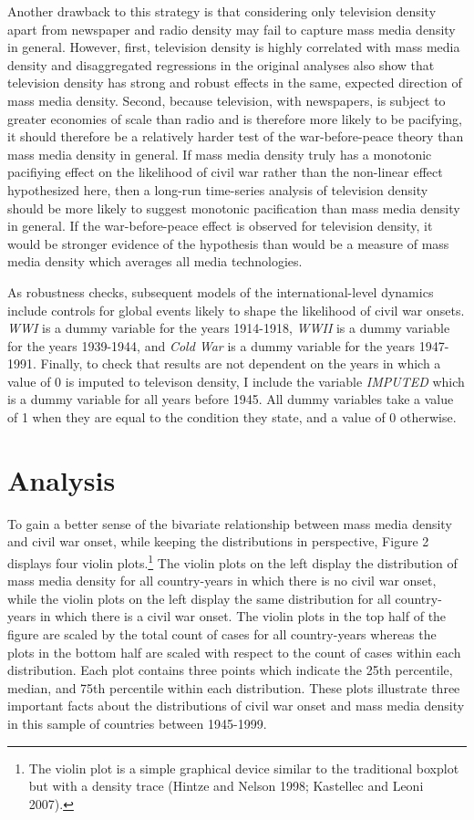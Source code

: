 \documentclass[11pt,article,oneside]{memoir}
\begin{document}
Another drawback to this strategy is that considering only television
density apart from newspaper and radio density may fail to capture mass
media density in general. However, first, television density is highly
correlated with mass media density and disaggregated regressions in the
original analyses also show that television density has strong and
robust effects in the same, expected direction of mass media density.
Second, because television, with newspapers, is subject to greater
economies of scale than radio and is therefore more likely to be
pacifying, it should therefore be a relatively harder test of the
war-before-peace theory than mass media density in general. If mass
media density truly has a monotonic pacifiying effect on the likelihood
of civil war rather than the non-linear effect hypothesized here, then a
long-run time-series analysis of television density should be more
likely to suggest monotonic pacification than mass media density in
general. If the war-before-peace effect is observed for television
density, it would be stronger evidence of the hypothesis than would be a
measure of mass media density which averages all media technologies.

As robustness checks, subsequent models of the international-level
dynamics include controls for global events likely to shape the
likelihood of civil war onsets. \emph{WWI} is a dummy variable for the
years 1914-1918, \emph{WWII} is a dummy variable for the years
1939-1944, and \emph{Cold War} is a dummy variable for the years
1947-1991. Finally, to check that results are not dependent on the years
in which a value of 0 is imputed to televison density, I include the
variable \emph{IMPUTED} which is a dummy variable for all years before
1945. All dummy variables take a value of 1 when they are equal to the
condition they state, and a value of 0 otherwise.

\section{Analysis}\label{analysis}

To gain a better sense of the bivariate relationship between mass media
density and civil war onset, while keeping the distributions in
perspective, Figure 2 displays four violin plots.\footnote{The violin
  plot is a simple graphical device similar to the traditional boxplot
  but with a density trace (Hintze and Nelson 1998; Kastellec and Leoni
  2007).} The violin plots on the left display the distribution of mass
media density for all country-years in which there is no civil war
onset, while the violin plots on the left display the same distribution
for all country-years in which there is a civil war onset. The violin
plots in the top half of the figure are scaled by the total count of
cases for all country-years whereas the plots in the bottom half are
scaled with respect to the count of cases within each distribution. Each
plot contains three points which indicate the 25th percentile, median,
and 75th percentile within each distribution. These plots illustrate
three important facts about the distributions of civil war onset and
mass media density in this sample of countries between 1945-1999.
\end{document}
